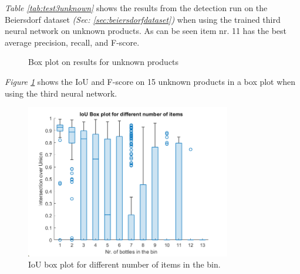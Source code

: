 \textit{Table \ref{tab:test3unknown}} shows the results from the detection run on the Beiersdorf dataset \textit{(Sec: \ref{sec:beiersdorfdataset})} when using the trained third neural network on unknown products. As can be seen item nr. 11 has the best average precision, recall, and F-score.

\clearpage
\begin{figure}[h]
 \centering
 \hfill
 
 \caption{Box plot on results for unknown products}
 \label{fig:v3unknowniou}
\end{figure}

\textit{Figure \ref{fig:v3unknowniou}} shows the IoU and F-score on 15 unknown products in a box plot when using the third neural network.
\begin{figure}[h]
 \centering
 \includegraphics[width=0.8\textwidth]{graphics/results/v3bottles.png}
 \caption{IoU box plot for different number of items in the bin.}
 \label{fig:v3bottles}
\end{figure}


